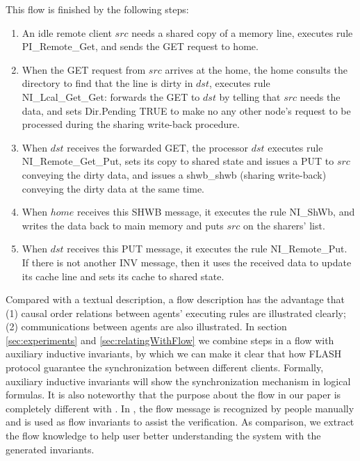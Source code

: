 \documentclass{llncs}
\begin{document}
This flow is finished by the following steps:
\begin{enumerate}
\item An idle remote  client $src$ needs a shared copy of a memory line, executes   rule PI\_Remote\_Get, and  sends the GET request to home.

\item  When the GET request from $src$ arrives at the
home, the home consults the directory to find that the line is dirty in $dst$,  executes rule NI\_Lcal\_Get\_Get: forwards the GET to $dst$ by telling that $src$ needs the data, and sets Dir.Pending TRUE to make no any other node's request to be processed during the sharing write-back procedure.

\item  When $dst$ receives the forwarded GET, the
processor $dst$ executes rule \\
NI\_Remote\_Get\_Put, sets its copy to shared state and issues a PUT to $src$ conveying the dirty data,  and  issues a   shwb\_shwb
 (sharing write-back) conveying the dirty data at the same time.

\item   When $home$ receives this SHWB message, it executes the rule NI\_ShWb, and
 writes the
data back  to main memory and puts $src$ on the sharers' list.

\item When $dst$ receives this PUT message, it executes the rule NI\_Remote\_Put. If there is not another INV message, then it   uses the received data to update its cache line and sets its cache to shared state.


\end{enumerate}

Compared with a textual description, a flow description has the advantage that (1) causal order relations between agents' executing rules are illustrated clearly; (2) communications between agents are also illustrated. In section \ref{sec:experiments} and \ref{sec:relatingWithFlow} we combine steps in a flow with auxiliary inductive invariants, by which we can make it clear that how  FLASH protocol guarantee the synchronization between different clients. Formally, auxiliary inductive invariants will show    the synchronization mechanism in logical formulas. It is also noteworthy that the purpose about the flow in our paper is completely different with \cite{Talupur2008a}. In \cite{Talupur2008a}, the flow message is recognized by people manually and is used as flow invariants to assist the verification. As comparison, we extract the flow knowledge  to help user better understanding the system with the generated invariants.
\end{document}
